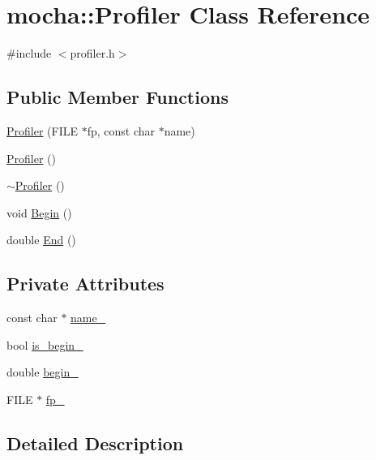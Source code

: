 \hypertarget{classmocha_1_1_profiler}{
\section{mocha::Profiler Class Reference}
\label{classmocha_1_1_profiler}
}


{\ttfamily \#include $<$profiler.h$>$}

\subsection*{Public Member Functions}
\begin{DoxyCompactItemize}
\item 
\hyperlink{classmocha_1_1_profiler_a9476e78baf3d5e4e4f3ff687fde7dc81}{Profiler} (FILE $\ast$fp, const char $\ast$name)
\item 
\hyperlink{classmocha_1_1_profiler_a60fb02c8d1e6543fa60358d35da95613}{Profiler} ()
\item 
\hyperlink{classmocha_1_1_profiler_a3ed7806be8604fc76184e8a4acfd9525}{$\sim$Profiler} ()
\item 
void \hyperlink{classmocha_1_1_profiler_a43b2cabfd9d49253cfc34bd1ec7f6362}{Begin} ()
\item 
double \hyperlink{classmocha_1_1_profiler_a3276bddfd3c763371d04a568741ff9ce}{End} ()
\end{DoxyCompactItemize}
\subsection*{Private Attributes}
\begin{DoxyCompactItemize}
\item 
const char $\ast$ \hyperlink{classmocha_1_1_profiler_a366afa77a22373b756d86a94fc87b9ff}{name\_\-}
\item 
bool \hyperlink{classmocha_1_1_profiler_a3d310dcf2156eba73e8417298276bfd3}{is\_\-begin\_\-}
\item 
double \hyperlink{classmocha_1_1_profiler_ac1dfc6e8883f0f99764917fc7ed3ece9}{begin\_\-}
\item 
FILE $\ast$ \hyperlink{classmocha_1_1_profiler_a680e138ef21bf5fa33c7bd403bcd655d}{fp\_\-}
\end{DoxyCompactItemize}


\subsection{Detailed Description}


